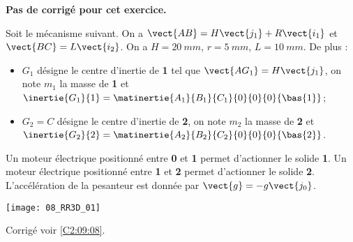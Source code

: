 \normalfalse \difficiletrue \tdifficilefalse
\correctionfalse


\setcounter{numques}{0}
\ifcorrection
\else
\textbf{Pas de corrigé pour cet exercice.}
\fi

\ifprof
\else
Soit le mécanisme suivant. On a $\vect{AB}=H\vect{j_1}+R\vect{i_1}$ et $\vect{BC}=L\vect{i_2}$. On a $H=\SI{20}{mm}$, $r=\SI{5}{mm}$, $L=\SI{10}{mm}$. De plus :
\begin{itemize}
\item $G_1$ désigne le centre d'inertie de \textbf{1} tel que $\vect{AG_1}=H\vect{j_1}$, on note $m_1$ la masse de \textbf{1} et $\inertie{G_1}{1}=\matinertie{A_1}{B_1}{C_1}{0}{0}{0}{\bas{1}}$; 
\item $G_2=C$ désigne le centre d'inertie de \textbf{2}, on note $m_2$ la masse de \textbf{2} et $\inertie{G_2}{2}=\matinertie{A_2}{B_2}{C_2}{0}{0}{0}{\bas{2}}$.
\end{itemize}

Un moteur électrique positionné entre \textbf{0} et \textbf{1} permet d'actionner le solide \textbf{1}.
Un moteur électrique positionné entre \textbf{1} et \textbf{2} permet d'actionner le solide \textbf{2}.
L'accélération de la pesanteur est donnée par $\vect{g}=-g\vect{j_0}$.

\begin{center}
\texttt{[image: 08\_RR3D\_01]}
\end{center}
\fi

\ifprof
\else
\fi

\ifprof
\else
\begin{flushright}
\footnotesize{Corrigé  voir \ref{C2:09:08}.}
\end{flushright}%
\fi